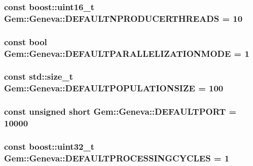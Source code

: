 \label{db/de9/namespaceGem_1_1Geneva_a7ba466fb273415c31b26532094f2dd51}
\hypertarget{namespaceGem_1_1Geneva_a505a99cdd13909343ea78ab3bdf56474}{
\subsubsection[{DEFAULTNPRODUCERTHREADS}]{\setlength{\rightskip}{0pt plus 5cm}const boost::uint16\_\-t {\bf Gem::Geneva::DEFAULTNPRODUCERTHREADS} = 10}}
\label{db/de9/namespaceGem_1_1Geneva_a505a99cdd13909343ea78ab3bdf56474}
\hypertarget{namespaceGem_1_1Geneva_a0d079f912cda83149347effa10cc7039}{
\subsubsection[{DEFAULTPARALLELIZATIONMODE}]{\setlength{\rightskip}{0pt plus 5cm}const bool {\bf Gem::Geneva::DEFAULTPARALLELIZATIONMODE} = 1}}
\label{db/de9/namespaceGem_1_1Geneva_a0d079f912cda83149347effa10cc7039}
\hypertarget{namespaceGem_1_1Geneva_a09727ec1a0c3212b45a43896ba422151}{
\subsubsection[{DEFAULTPOPULATIONSIZE}]{\setlength{\rightskip}{0pt plus 5cm}const std::size\_\-t {\bf Gem::Geneva::DEFAULTPOPULATIONSIZE} = 100}}
\label{db/de9/namespaceGem_1_1Geneva_a09727ec1a0c3212b45a43896ba422151}
\hypertarget{namespaceGem_1_1Geneva_ab35a5c233444f13095b80a36270de007}{
\subsubsection[{DEFAULTPORT}]{\setlength{\rightskip}{0pt plus 5cm}const unsigned short {\bf Gem::Geneva::DEFAULTPORT} = 10000}}
\label{db/de9/namespaceGem_1_1Geneva_ab35a5c233444f13095b80a36270de007}
\hypertarget{namespaceGem_1_1Geneva_a6c15979db3e3fb1efa968e5444296b01}{
\subsubsection[{DEFAULTPROCESSINGCYCLES}]{\setlength{\rightskip}{0pt plus 5cm}const boost::uint32\_\-t {\bf Gem::Geneva::DEFAULTPROCESSINGCYCLES} = 1}}
